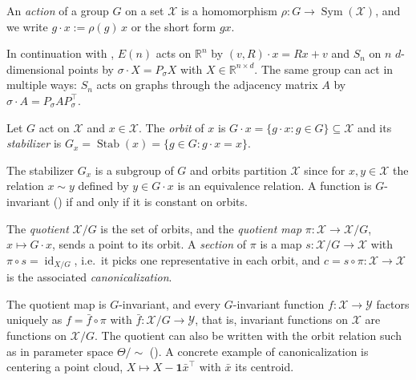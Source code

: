 \documentclass[mathematics,review,submit,moreauthors]{Definitions/mdpi}
\begin{document}
\begin{Definition}\label{def:group-action}
    An \emph{action} of a group $G$ on a set $\mathcal{X}$ is a homomorphism $\rho:G\to\operatorname{Sym}(\mathcal{X})$, and we write $g\cdot x:=\rho(g)\,x$ or the short form $gx$.
\end{Definition}

In continuation with , $E(n)$ acts on $\mathbb{R}^n$ by $(v,R)\cdot x=Rx+v$ and $S_n$ on $n$ $d$-dimensional points by $\sigma\cdot X=P_\sigma X$ with $X\in\mathbb{R}^{n\times d}$.
The same group can act in multiple ways: $S_n$ acts on graphs through the adjacency matrix $A$ by $\sigma\cdot A=P_\sigma AP_\sigma^\top$.

\begin{Definition}\label{def:orbit-stabilizer}
    Let $G$ act on $\mathcal{X}$ and $x\in\mathcal{X}$.
    The \emph{orbit} of $x$ is $G\cdot x=\{g\cdot x: g\in G\}\subseteq\mathcal{X}$ and its \emph{stabilizer} is $G_x=\operatorname{Stab}(x)=\{g\in G: g\cdot x=x\}$.
\end{Definition}

The stabilizer $G_x$ is a subgroup of $G$ and orbits partition $\mathcal{X}$ since for $x,y\in \mathcal{X}$ the relation $x\sim y$ defined by $y\in G\cdot x$ is an equivalence relation.
A function is $G$-invariant () if and only if it is constant on orbits.

\begin{Definition}\label{def:quotient}
    The \emph{quotient} $\mathcal{X}/G$ is the set of orbits, and the \emph{quotient map} $\pi:\mathcal{X}\to\mathcal{X}/G$, $x\mapsto G\cdot x$, sends a point to its orbit.
    A \emph{section} of $\pi$ is a map $s:\mathcal{X}/G\to\mathcal{X}$ with $\pi\circ s=\operatorname{id}_{X/G}$, i.e.\ it picks one representative in each orbit, and $c=s\circ\pi:\mathcal{X}\to\mathcal{X}$ is the associated \emph{canonicalization}.
\end{Definition}

The quotient map is $G$-invariant, and every $G$-invariant function $f:\mathcal{X}\to\mathcal{Y}$ factors uniquely as $f=\bar f \circ\pi$ with $\bar f:\mathcal{X}/G\to\mathcal{Y}$, that is, invariant functions on $\mathcal{X}$ are functions on $\mathcal{X}/G$.
The quotient can also be written with the orbit relation such as in parameter space $\Theta/\!\sim$ ().
A concrete example of canonicalization is centering a point cloud, $X\mapsto X-\boldsymbol{1}\bar{x}^\top$ with $\bar{x}$ its centroid.
\end{document}
